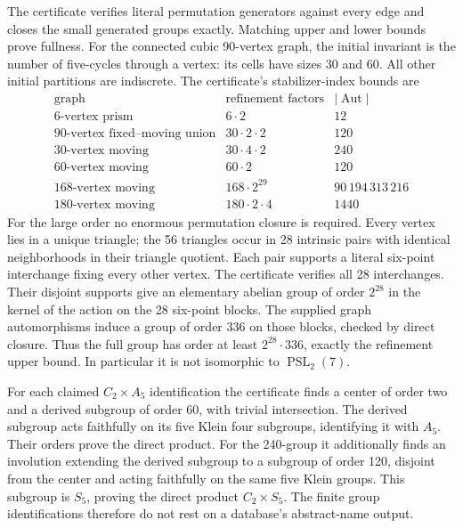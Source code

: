 \documentclass[11pt,a4paper]{article}
\newcommand{\PSL}{\operatorname{PSL}}\newcommand{\PGL}{\operatorname{PGL}}
\begin{document}
The certificate verifies literal permutation generators against every
edge and closes the small generated groups exactly. Matching upper and
lower bounds prove fullness. For the connected cubic 90-vertex graph,
the initial invariant is the number of five-cycles through a vertex: its
cells have sizes 30 and 60. All other initial partitions are indiscrete.
The certificate's stabilizer-index bounds are
\[
\begin{array}{c|c|r}
\text{graph}&\text{refinement factors}&|\operatorname{Aut}|\\\hline
6\text{-vertex prism}&6\cdot2&12\\
90\text{-vertex fixed--moving union}&30\cdot2\cdot2&120\\
30\text{-vertex moving}&30\cdot4\cdot2&240\\
60\text{-vertex moving}&60\cdot2&120\\
168\text{-vertex moving}&168\cdot2^{29}&90\,194\,313\,216\\
180\text{-vertex moving}&180\cdot2\cdot4&1440
\end{array}
\]
For the large order no enormous permutation closure is required. Every
vertex lies in a unique triangle; the 56 triangles occur in 28 intrinsic
pairs with identical neighborhoods in their triangle quotient. Each pair
supports a literal six-point interchange fixing every other vertex.
The certificate verifies all 28 interchanges. Their disjoint supports give
an elementary abelian group of order $2^{28}$ in the kernel of the action
on the 28 six-point blocks. The supplied graph automorphisms induce a
group of order 336 on those blocks, checked by direct closure. Thus the
full group has order at least $2^{28}\cdot336$, exactly the refinement
upper bound. In particular it is not isomorphic to $\PSL_2(7)$.

For each claimed $C_2\times A_5$ identification the certificate finds a
center of order two and a derived subgroup of order 60, with trivial
intersection. The derived subgroup acts faithfully on its five Klein four
subgroups, identifying it with $A_5$. Their orders prove the direct product.
For the 240-group it additionally finds an involution extending the derived
subgroup to a subgroup of order 120, disjoint from the center and acting
faithfully on the same five Klein groups. This subgroup is $S_5$, proving
the direct product $C_2\times S_5$. The finite group identifications therefore
do not rest on a database's abstract-name output.
\end{document}
